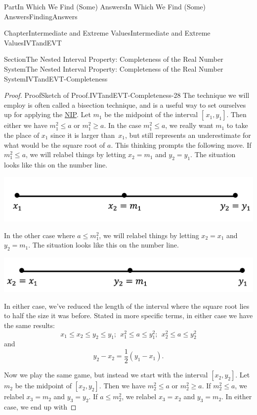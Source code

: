 \documentclass[oneside,10pt,]{book}
\numberwithin{equation}{part}
\begin{document}
\begin{partptx}{Part}{In Which We Find (Some) Answers}{}{In Which We Find (Some) Answers}{}{}{FindingAnswers}
\begin{chapterptx}{Chapter}{Intermediate and Extreme Values}{}{Intermediate and Extreme Values}{}{}{IVTandEVT}
\begin{sectionptx}{Section}{The Nested Interval Property: Completeness of the Real Number System}{}{The Nested Interval Property: Completeness of the Real Number System}{}{}{IVTandEVT-Completeness}
\begin{proof}{Proof}{Sketch of Proof.}{IVTandEVT-Completeness-28}
The technique we will employ is often called a bisection technique, and is a useful way to set ourselves up for applying the \hyperref[NIP]{NIP}. Let \(m_1\) be the midpoint of the interval \([\,x_1,y_1]\).  Then either we have \(m_1^2\leq
a\) or \(m_1^2\geq a\).  In the case \(m_1^2\leq a\), we really want \(m_1\) to take the place of \(x_1\) since it is larger than \(\,x_1\), but still represents an underestimate for what would be the square root of \(a\). This thinking prompts the following move.  If \(m_1^2\leq
a\), we will relabel things by letting \(x_2=m_1\) and \(y_2=y_1\).  The situation looks like this on the number line.%
\begin{image}{0.22}{0.56}{0.22}{}%
\includegraphics[width=\linewidth]{external/images/Ch6fig5.png}
\end{image}%
In the other case where \(a\leq m_1^2\), we will relabel things by letting \(x_2=x_1\) and \(y_2=m_1\).  The situation looks like this on the number line.%
\begin{image}{0.22}{0.56}{0.22}{}%
\includegraphics[width=\linewidth]{external/images/Ch6fig6.png}
\end{image}%
In either case, we've reduced the length of the interval where the square root lies to half the size it was before.  Stated in more specific terms, in either case we have the same results:%
\begin{equation*}
x_1\leq x_2\leq y_2\leq y_1;\ \  x_1^2\leq a\leq y_1^2;\ \  x_2^2\leq a\leq y_2^2
\end{equation*}
and%
\begin{equation*}
y_2-x_2=\frac{1}{2}\left(y_1-x_1\right)\text{.}
\end{equation*}
%
\par
Now we play the same game, but instead we start with the interval \([x_2,y_2]\).  Let \(m_2\) be the midpoint of \([x_2,y_2]\).  Then we have \(m_2^2\leq a\) or \(m_2^2\geq a\).  If \(m_2^2\leq a\), we relabel \(x_3=m_2\) and \(y_3=y_2\).  If \(a\leq m_2^2\), we relabel \(x_3=x_2\) and \(y_3=m_2\).  In either case, we end up with%

\end{proof}
\end{sectionptx}
\end{chapterptx}
\end{partptx}
\end{document}
